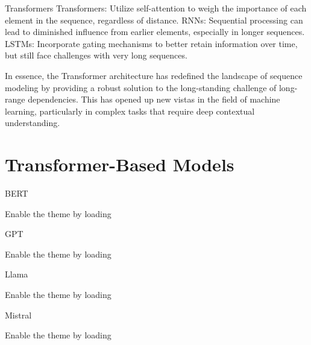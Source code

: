 \documentclass[10pt]{beamer}
\begin{document}
\begin{frame}[fragile]{Transformers}
	Transformers: Utilize self-attention to weigh the importance of each element in the sequence, regardless of
	distance. RNNs: Sequential processing can lead to diminished influence from earlier elements, especially in longer
	sequences. LSTMs: Incorporate gating mechanisms to better retain information over time, but still face challenges
	with very long sequences.

	In essence, the Transformer architecture has redefined the landscape of sequence modeling by providing a robust
	solution to the long-standing challenge of long-range dependencies. This has opened up new vistas in the field of
	machine learning, particularly in complex tasks that require deep contextual understanding.

\end{frame}

\section[Transformer-Based Models]{Transformer-Based Models}

\begin{frame}[fragile]{BERT}

	Enable the theme by loading

\end{frame}

\begin{frame}[fragile]{GPT}

	Enable the theme by loading

\end{frame}

\begin{frame}[fragile]{Llama}

	Enable the theme by loading

\end{frame}

\begin{frame}[fragile]{Mistral}

	Enable the theme by loading

\end{frame}
\end{document}
